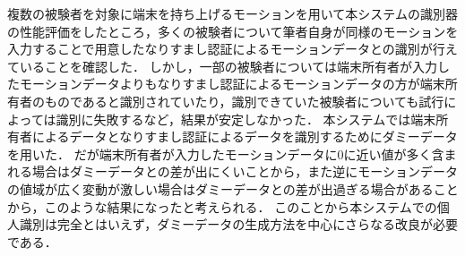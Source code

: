 複数の被験者を対象に端末を持ち上げるモーションを用いて本システムの識別器の性能評価をしたところ，多くの被験者について筆者自身が同様のモーションを入力することで用意したなりすまし認証によるモーションデータとの識別が行えていることを確認した．
しかし，一部の被験者については端末所有者が入力したモーションデータよりもなりすまし認証によるモーションデータの方が端末所有者のものであると識別されていたり，識別できていた被験者についても試行によっては識別に失敗するなど，結果が安定しなかった．
本システムでは端末所有者によるデータとなりすまし認証によるデータを識別するためにダミーデータを用いた．
だが端末所有者が入力したモーションデータに0に近い値が多く含まれる場合はダミーデータとの差が出にくいことから，また逆にモーションデータの値域が広く変動が激しい場合はダミーデータとの差が出過ぎる場合があることから，このような結果になったと考えられる．
このことから本システムでの個人識別は完全とはいえず，ダミーデータの生成方法を中心にさらなる改良が必要である．
